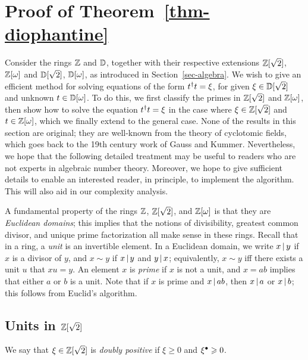 \section[Proof of Theorem 6.2]{Proof of Theorem~\ref{thm-diophantine}}
\label{app-rings}

Consider the rings $\mathbb{Z}$ and ${\mathbb{D}}$, together with their respective
extensions $\mathbb{Z}[\sqrt2]$, $\mathbb{Z}[\omega]$ and ${\mathbb{D}}[\sqrt2]$, ${\mathbb{D}}[\omega]$,
as introduced in Section~\ref{sec-algebra}. We wish to give an
efficient method for solving equations of the form $t^{\dagger} t=\xi$, for
given $\xi\in{\mathbb{D}}[\sqrt2]$ and unknown $t\in{\mathbb{D}}[\omega]$. To do this, we
first classify the primes in $\mathbb{Z}[\sqrt2]$ and $\mathbb{Z}[\omega]$, then show
how to solve the equation $t^{\dagger} t=\xi$ in the case where
$\xi\in\mathbb{Z}[\sqrt2]$ and $t\in\mathbb{Z}[\omega]$, which we finally extend to
the general case. None of the results in this section are original;
they are well-known from the theory of cyclotomic fields, which goes
back to the 19th century work of Gauss and Kummer.  Nevertheless, we
hope that the following detailed treatment may be useful to readers
who are not experts in algebraic number theory. Moreover, we hope to
give sufficient details to enable an interested reader, in principle,
to implement the algorithm. This will also aid in our complexity
analysis.

A fundamental property of the rings $\mathbb{Z}$, $\mathbb{Z}[\sqrt2]$, and
$\mathbb{Z}[\omega]$ is that they are {\em Euclidean domains}; this implies
that the notions of divisibility, greatest common divisor, and unique
prime factorization all make sense in these rings.  Recall that in a
ring, a {\em unit} is an invertible element.  In a Euclidean domain,
we write $x\mathop{|}\nolimits y$ if $x$ is a divisor of $y$, and $x\sim y$ if
$x\mathop{|}\nolimits y$ and $y\mathop{|}\nolimits x$; equivalently, $x\sim y$ iff there
exists a unit $u$ that $x u=y$. An element $x$ is {\em prime} if $x$
is not a unit, and $x=ab$ implies that either $a$ or $b$ is a
unit. Note that if $x$ is prime and $x\mathop{|}\nolimits ab$, then $x\mathop{|}\nolimits a$
or $x\mathop{|}\nolimits b$; this follows from Euclid's algorithm.

\subsection[{Units in Z[sqrt 2]}]{Units in $\mathbb{Z}[\sqrt2]$}

\begin{definition}
  We say that $\xi\in\mathbb{Z}[\sqrt 2]$ is {\em doubly positive} if $\xi\geq
  0$ and $\xi^{\bullet} \geqslant 0$.
\end{definition}

